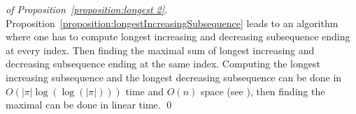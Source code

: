\documentclass[a4paper]{llncs}
\newcommand{\ptext}{\pi}
\newcounter{num}
\begin{document}
\bigskip

\begin{proof}[of Proposition~\ref{proposition:longest 2}]
Proposition~\ref{proposition:longestIncreasingSubsequence} leads to an algorithm
where one has to compute longest increasing and decreasing subsequence ending at every index. Then finding the maximal sum of longest increasing and decreasing subsequence ending at the same index.
Computing the longest increasing subsequence and the longest decreasing subsequence can be done in 
$O(|\ptext|\log(\log(|\ptext|)))$ time and $O(n)$ space 
(see \cite{Bespamyatnikh00enumeratinglongest}), 
then finding the maximal can be done in linear time.
\qed
\end{proof}

\end{document}
